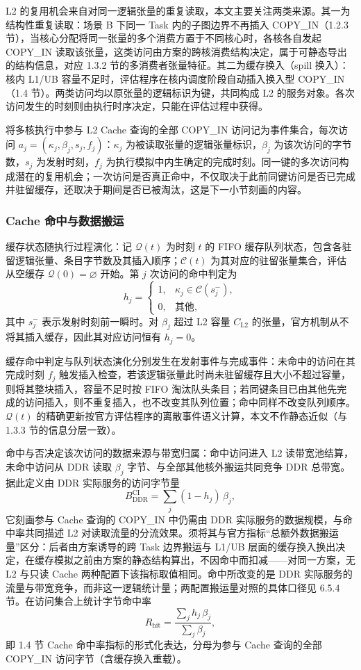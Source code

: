 L2 的复用机会来自对同一逻辑张量的重复读取，本文主要关注两类来源。其一为结构性重复读取：场景 B 下同一 Task 内的子图边界不再插入 COPY\_IN（1.2.3 节），当核心分配将同一张量的多个消费方置于不同核心时，各核各自发起 COPY\_IN 读取该张量，这类访问由方案的跨核消费结构决定，属于可静态导出的结构信息，对应 1.3.2 节的多消费者张量特征。其二为缓存换入（spill 换入）：核内 L1/UB 容量不足时，评估程序在核内调度阶段自动插入换入型 COPY\_IN（1.4 节）。两类访问均以原张量的逻辑标识为键，共同构成 L2 的服务对象。各次访问发生的时刻则由执行时序决定，只能在评估过程中获得。

将多核执行中参与 L2 Cache 查询的全部 COPY\_IN 访问记为事件集合，每次访问 $a_j=(\kappa_j,\beta_j,s_j,f_j)$：$\kappa_j$ 为被读取张量的逻辑张量标识，$\beta_j$ 为该次访问的字节数，$s_j$ 为发射时刻，$f_j$ 为执行模拟中内生确定的完成时刻。同一键的多次访问构成潜在的复用机会；一次访问是否真正命中，不仅取决于此前同键访问是否已完成并驻留缓存，还取决于期间是否已被淘汰，这是下一小节刻画的内容。

\subsubsection{Cache 命中与数据搬运}

缓存状态随执行过程演化：记 $\mathcal{Q}(t)$ 为时刻 $t$ 的 FIFO 缓存队列状态，包含各驻留逻辑张量、条目字节数及其插入顺序；$\mathcal{C}(t)$ 为其对应的驻留张量集合，评估从空缓存 $\mathcal{Q}(0)=\varnothing$ 开始。第 $j$ 次访问的命中判定为
\[ h_j=\begin{cases}1, & \kappa_j\in\mathcal{C}(s_j^{-}),\\ 0, & \text{其他},\end{cases} \]
其中 $s_j^{-}$ 表示发射时刻前一瞬时。对 $\beta_j$ 超过 L2 容量 $C_{\mathrm{L2}}$ 的张量，官方机制从不将其插入缓存，因此其对应访问恒有 $h_j=0$。

缓存命中判定与队列状态演化分别发生在发射事件与完成事件：未命中的访问在其完成时刻 $f_j$ 触发插入检查，若该逻辑张量此时尚未驻留缓存且大小不超过容量，则将其整块插入，容量不足时按 FIFO 淘汰队头条目；若同键条目已由其他先完成的访问插入，则不重复插入，也不改变其队列位置；命中同样不改变队列顺序。$\mathcal{Q}(t)$ 的精确更新按官方评估程序的离散事件语义计算，本文不作静态近似（与 1.3.3 节的信息分层一致）。

命中与否决定该次访问的数据来源与带宽归属：命中访问进入 L2 读带宽池结算，未命中访问从 DDR 读取 $\beta_j$ 字节、与全部其他核外搬运共同竞争 DDR 总带宽。据此定义由 DDR 实际服务的访问字节量
\[ B_{\mathrm{DDR}}^{\mathrm{CI}}=\sum_{j}(1-h_j)\,\beta_j, \]
它刻画参与 Cache 查询的 COPY\_IN 中仍需由 DDR 实际服务的数据规模，与命中率共同描述 L2 对读取流量的分流效果。须将其与官方指标“总额外数据搬运量”区分：后者由方案诱导的跨 Task 边界搬运与 L1/UB 层面的缓存换入换出决定，在缓存模拟之前由方案的静态结构算出，不因命中而扣减——对同一方案，无 L2 与只读 Cache 两种配置下该指标取值相同。命中所改变的是 DDR 实际服务的流量与带宽竞争，而非这一逻辑统计量；两配置搬运量对照的具体口径见 6.5.4 节。在访问集合上统计字节命中率
\[ R_{\mathrm{hit}}=\frac{\sum_{j} h_j\,\beta_j}{\sum_{j}\beta_j}, \]
即 1.4 节 Cache 命中率指标的形式化表达，分母为参与 Cache 查询的全部 COPY\_IN 访问字节（含缓存换入重载）。

